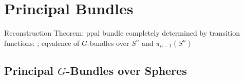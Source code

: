 \chapter{Principal Bundles}

Reconstruction Theorem: ppal bundle completely determined by transition functions: ; eqvalence of $G$-bundles over $S^n$ and $\pi_{n-1}(S^n)$

\section{Principal $G$-Bundles over Spheres}